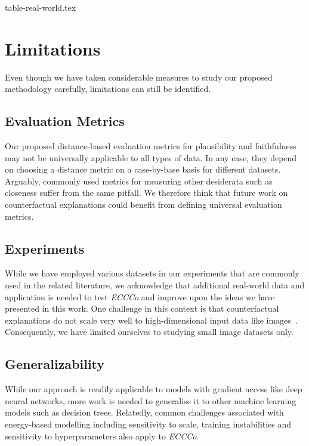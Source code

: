 {table-real-world.tex}

\section{Limitations}

Even though we have taken considerable measures to study our proposed methodology carefully, limitations can still be identified. 

\subsection{Evaluation Metrics}

Our proposed distance-based evaluation metrics for plausibility and faithfulness may not be universally applicable to all types of data. In any case, they depend on choosing a distance metric on a case-by-base basis for different datasets. Arguably, commonly used metrics for measuring other desiderata such as closeness suffer from the same pitfall. We therefore think that future work on counterfactual explanations could benefit from defining universal evaluation metrics. 

\subsection{Experiments}

While we have employed various datasets in our experiments that are commonly used in the related literature, we acknowledge that additional real-world data and application is needed to test \textit{ECCCo} and improve upon the ideas we have presented in this work. One challenge in this context is that counterfactual explanations do not scale very well to high-dimensional input data like images~\citep{samoilescu2021model,chen2021seven}. Consequently, we have limited ourselves to studying small image datasets only. 

\subsection{Generalizability}

While our approach is readily applicable to models with gradient access like deep neural networks, more work is needed to generalise it to other machine learning models such as decision trees. Relatedly, common challenges associated with energy-based modelling including sensitivity to scale, training instabilities and sensitivity to hyperparameters also apply to \textit{ECCCo}.

